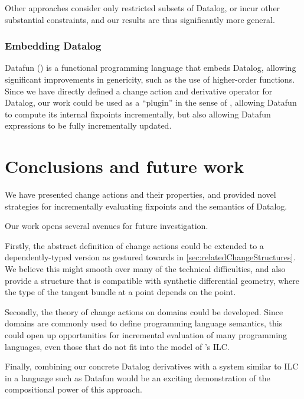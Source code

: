 Other approaches \autocites{dong2000incremental}{urpi1992method} consider only
restricted subsets of Datalog, or incur other substantial constraints, and our results
are thus significantly more general.

\subsubsection{Embedding Datalog}
\label{sec:embeddingDatalog}

Datafun (\textcite{arntz2016datafun}) is a functional programming language that embeds
Datalog, allowing significant improvements in genericity, such as the use of
higher-order functions. Since we have directly defined a change action and
derivative operator for Datalog, our work could be used as a ``plugin'' in the sense
of \citeauthor{cai2014changes}, allowing Datafun to compute its internal fixpoints
incrementally, but also allowing Datafun expressions to be fully incrementally updated.

\section{Conclusions and future work}

We have presented change actions and their properties, and provided novel
strategies for incrementally evaluating fixpoints and the semantics of Datalog.

Our work opens several avenues for future investigation.

Firstly, the abstract definition of change actions could be extended to a
dependently-typed version as gestured towards in
\cref{sec:relatedChangeStructures}. We believe this might smooth over many of
the technical difficulties, and also provide a structure that is compatible with
synthetic differential geometry, where the type of the tangent bundle at a point
depends on the point.

Secondly, the theory of change actions on domains could be developed. Since
domains are commonly used to define programming language semantics, this could
open up opportunities for incremental evaluation of many programming languages,
even those that do not fit into the model of \citeauthor{cai2014changes}'s ILC.

Finally, combining our concrete Datalog derivatives with a system similar to ILC
in a language such as Datafun would be an exciting demonstration of the compositional
power of this approach.

\printbibliography

